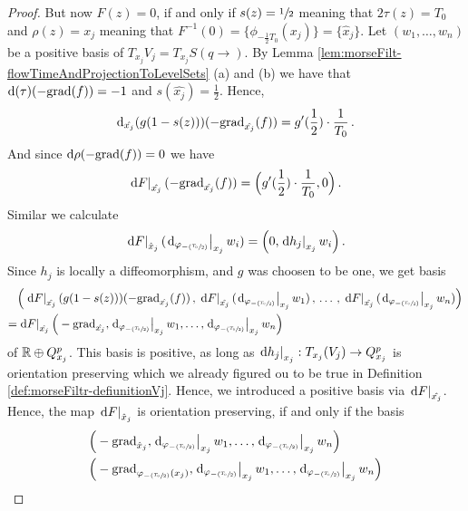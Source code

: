 \begin{proof}
But now $F(z)=0$, if and only if $s(z)=\sfrac{1}{2}$ meaning that $2\tau(z)=T_0$ and $\rho(z)=x_j$ meaning that $F^{-1}(0)=\{\phi_{-\frac{1}{2}T_0}(x_j)\}=\{\hat{x}_j\}$.
 Let $(w_1,\dots ,w_n)$ be a positive basis of $T_{x_j}V_j=T_{x_j}S(q\to)$. By Lemma \ref{lem:morseFilt-flowTimeAndProjectionToLevelSets} (a) and (b) we have that $\mathop{}\!\mathrm{d}(\tau)(-\mathrm{grad}(f))=-1$ and $s(\hat{x_j})=\frac{1}{2}$. 
 Hence, 
\begin{equation*}
	\mathop{}\!\mathrm{d}_{\hat{x_j}} (g(1-s(z)))(-\mathrm{grad}_{\hat{x_j}}(f))=g'(\frac{1}{2})\cdot \frac{1}{T_0}\,.
\end{equation*} And since
 $\mathop{}\!\mathrm{d} \rho (-\mathrm{grad}(f))=0$ we have
\begin{equation*}
\left.\mathop{}\!\mathrm{d} F\right|_{\hat{x_j}}(-\mathrm{grad}_{\hat{x_j}}(f))=\Big(g'(\frac{1}{2})\cdot \frac{1}{T_0},0\Big)\,.
\end{equation*} Similar we calculate
\begin{equation*}
	\left.\mathop{}\!\mathrm{d} F\right|_{\hat{x}_j}(\left.\mathop{}\!\mathrm{d}_{\varphi_{-(\sfrac{T_0}{2})}}\right|_{{x_j}}w_i)=\Big(0,\left.\mathop{}\!\mathrm{d} h_j\right|_{x_j}w_i \Big)\,.
\end{equation*}
Since $h_j$ is locally a diffeomorphism, and $g$ was choosen to be one, we get basis 
\begin{align*}
	&\Big(	\restr{\diff F}{\hat{x_j}} (g(1-s(z)))(-\grad_{\hat{x_j}}(f))\,,\,\restr{\diff F}{\hat{x_j}}(\restr{\diff_{\phi_{-(\sfrac{T_0}{2})}}}{{x_j}}w_1)\,,\,\dots\,,\, \restr{\diff F}{\hat{x_j}}(\restr{\diff_{\phi_{-(\sfrac{T_0}{2})}}}{{x_j}}w_n)\Big) \\
	=&\restr{\diff F}{\hat{x_j}}\Big(-\grad_{\hat{x_j}},\restr{\diff_{\phi_{-(\sfrac{T_0}{2})}}}{{x_j}}w_1,\dots,\restr{\diff_{\phi_{-(\sfrac{T_0}{2})}}}{{x_j}}w_n\Big)
\end{align*} of $\mathbb{R}\oplus Q^p_{x_j}$. This basis is positive, as long as $\left.\mathop{}\!\mathrm{d} h_j\right|_{x_j}:T_{x_j}(V_j)\to Q^p_{x_j}$ is orientation preserving which we already figured ou to be true in Definition \ref{def:morseFiltr-defiunitionVj}. Hence, we introduced a positive basis via $\left.\mathop{}\!\mathrm{d} F\right|_{\hat{x_j}}$. Hence, the map $\left.\mathop{}\!\mathrm{d} F\right|_{\hat{x}_j}$ is orientation preserving, if and only if the basis 
\begin{align*}
	&\Big(-\mathrm{grad}_{\hat{x}_j},\left.\mathop{}\!\mathrm{d}_{\varphi_{-(\sfrac{T_0}{2})}}\right|_{{x_j}}w_1,\dots,\left.\mathop{}\!\mathrm{d}_{\varphi_{-(\sfrac{T_0}{2})}}\right|_{{x_j}}w_n\Big)\\
	&\Big(-\mathrm{grad}_{\varphi_{-(\sfrac{T_0}{2})}(x_j)},\left.\mathop{}\!\mathrm{d}_{\varphi_{-(\sfrac{T_0}{2})}}\right|_{{x_j}}w_1,\dots,\left.\mathop{}\!\mathrm{d}_{\varphi_{-(\sfrac{T_0}{2})}}\right|_{{x_j}}w_n\Big)
\end{align*}

\end{proof}
